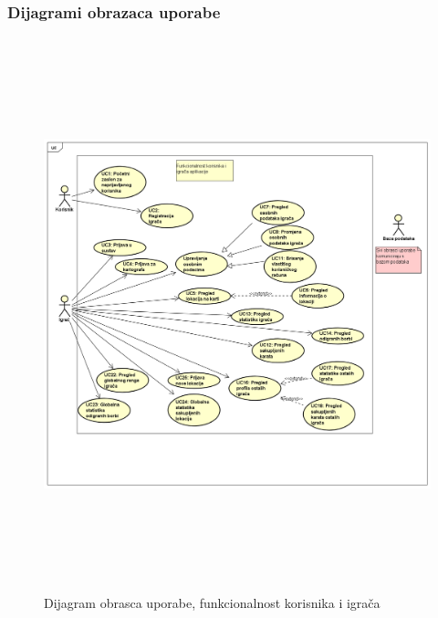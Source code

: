 				\eject
					
				\subsubsection{Dijagrami obrazaca uporabe}
					
					\begin{figure}[H]
						\includegraphics[width=\textwidth, height=16cm]{dijagrami/OU_igrac} 
						\centering
						\caption{Dijagram obrasca uporabe, funkcionalnost korisnika i igrača}
						\label{}
					\end{figure}
					
